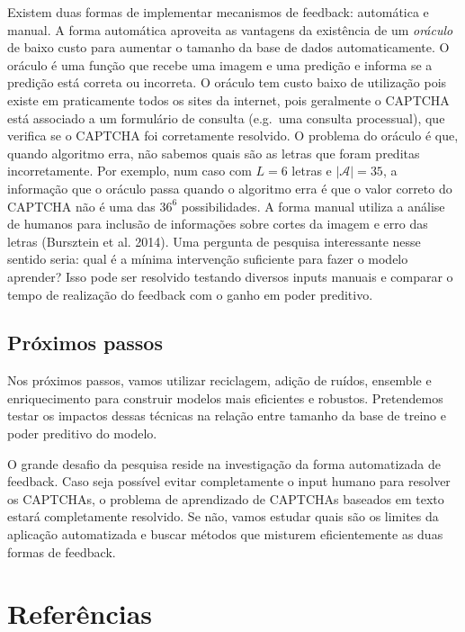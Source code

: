 \documentclass[]{elsarticle} %
\begin{document}
Existem duas formas de implementar mecanismos de feedback: automática e manual. A forma automática aproveita as vantagens da existência de um \emph{oráculo} de baixo custo para aumentar o tamanho da base de dados automaticamente. O oráculo é uma função que recebe uma imagem e uma predição e informa se a predição está correta ou incorreta. O oráculo tem custo baixo de utilização pois existe em praticamente todos os sites da internet, pois geralmente o CAPTCHA está associado a um formulário de consulta (e.g.~uma consulta processual), que verifica se o CAPTCHA foi corretamente resolvido. O problema do oráculo é que, quando algoritmo erra, não sabemos quais são as letras que foram preditas incorretamente. Por exemplo, num caso com \(L=6\) letras e \(|\mathcal A|=35\), a informação que o oráculo passa quando o algoritmo erra é que o valor correto do CAPTCHA não é uma das \(36^6\) possibilidades. A forma manual utiliza a análise de humanos para inclusão de informações sobre cortes da imagem e erro das letras (Bursztein et al. 2014). Uma pergunta de pesquisa interessante nesse sentido seria: qual é a mínima intervenção suficiente para fazer o modelo aprender? Isso pode ser resolvido testando diversos inputs manuais e comparar o tempo de realização do feedback com o ganho em poder preditivo.

\hypertarget{proximos-passos}{%
\subsection{Próximos passos}\label{proximos-passos}}

Nos próximos passos, vamos utilizar reciclagem, adição de ruídos, ensemble e enriquecimento para construir modelos mais eficientes e robustos. Pretendemos testar os impactos dessas técnicas na relação entre tamanho da base de treino e poder preditivo do modelo.

O grande desafio da pesquisa reside na investigação da forma automatizada de feedback. Caso seja possível evitar completamente o input humano para resolver os CAPTCHAs, o problema de aprendizado de CAPTCHAs baseados em texto estará completamente resolvido. Se não, vamos estudar quais são os limites da aplicação automatizada e buscar métodos que misturem eficientemente as duas formas de feedback.

\hypertarget{references}{%
\section*{Referências}\label{references}}
\end{document}
